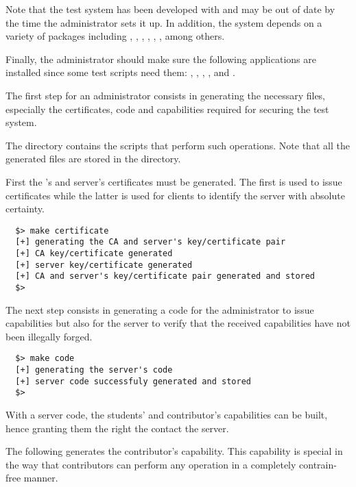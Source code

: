 Note that the test system has been developed with  and
may be out of date by the time the administrator sets it up. In addition,
the system depends on a variety of  packages including
, , , , ,
,  among others.

Finally, the administrator should make sure the following applications
are installed since some test scripts need them: , ,
, ,  and .


The first step for an administrator consists in generating the necessary
files, especially the certificates, code and capabilities required for
securing the test system.

The  directory contains the scripts that perform
such operations. Note that all the generated files are stored in the
 directory.

First the 's and server's certificates
must be generated. The first is used to issue certificates while the latter
is used for clients to identify the server with absolute certainty.

\begin{verbatim}
  $> make certificate
  [+] generating the CA and server's key/certificate pair
  [+] CA key/certificate generated
  [+] server key/certificate generated
  [+] CA and server's key/certificate pair generated and stored
  $> 
\end{verbatim}

The next step consists in generating a code for the administrator to
issue capabilities but also for the server to verify that the received
capabilities have not been illegally forged.

\begin{verbatim}
  $> make code
  [+] generating the server's code
  [+] server code successfuly generated and stored
  $> 
\end{verbatim}

With a server code, the students' and contributor's capabilities can be
built, hence granting them the right the contact the server.

The following generates the contributor's capability. This capability is
special in the way that contributors can perform any operation in a completely
contrain-free manner.

